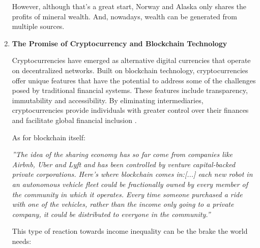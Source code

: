 \begin{enumerate}

However, although that's a great start, Norway and Alaska only shares the profits of mineral wealth. And, nowadays, wealth can be generated from multiple sources.\newline


    \item \textbf{The Promise of Cryptocurrency and Blockchain Technology}


Cryptocurrencies have emerged as alternative digital currencies that operate on decentralized networks. Built on blockchain technology, cryptocurrencies offer unique features that have the potential to address some of the challenges posed by traditional financial systems. These features include transparency, immutability and accessibility. By eliminating intermediaries, cryptocurrencies provide individuals with greater control over their finances and facilitate global financial inclusion \cite{twp, cwi, coint}.

As for blockchain itself:

\begin{flushright}
   \textsl{''The idea of the sharing economy has so far come from companies like Airbnb, Uber and Lyft and has been controlled by venture capital-backed private corporations. Here’s where blockchain comes in:[...] each new robot in an autonomous vehicle fleet could be fractionally owned by every member of the community in which it operates. Every time someone purchased a ride with one of the vehicles, rather than the income only going to a private company, it could be distributed to everyone in the community.'' \cite{twp}} \\

\end{flushright}

This type of reaction towards income inequality can be the brake the world needs:


\end{enumerate}
